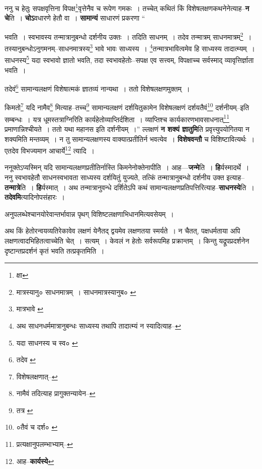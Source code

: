 \documentclass[article,12pt,a4paper]{memoir}
\begin{document}
	  \pstart ननु च हेतुः सपक्षवृत्तिना विपक्ष\footnote{क्षा}वृत्तेनैव च रूपेण गमकः । तच्चेत् कथितं किं विशेषलक्षणकथनेनेत्याह--\textbf{न चे}ति । \textbf{चोऽ}वधारणे हेतौ वा । \textbf{सामान्यं} साधारणं प्रकरणा  \leavevmode{} “
	  
	भवति । स्वभावस्य तन्मात्रानुबन्धो दर्शनीय उक्तः । तदिति साधनम् । तदेव तन्मात्रम् साधनमात्रम्\footnote{मात्रस्यानु० \cite{dp-msC} \cite{dp-msD} साधनमात्रम् । साधनमात्रस्यानुब० \cite{dp-msB} \cite{dp-edN}} । तस्यानुबन्धोऽनुगमनम्--साधनमात्रस्य\footnote{मात्रभावे \cite{dp-msA} \cite{dp-msB} \cite{dp-msD} \cite{dp-edP} \cite{dp-edH} \cite{dp-edE} \cite{dp-edN}} भावे भावः साध्यस्य । \footnote{अथ साधनधर्ममात्रानुबन्धः साध्यस्य तथापि तादात्म्यं न स्यादित्याह--\cite{dp-msD-n}}तन्मात्रभावित्वमेव हि साध्यस्य तादात्म्यम् । साधनस्य\footnote{यदा साधनस्य च स्व० \cite{dp-msC}} यदा स्वभावो ज्ञातो भवति, तदा स्वभावहेतोः--सपक्ष एव सत्त्वम्, विपक्षाच्च सर्वस्माद् व्यावृत्तिर्ज्ञाता भवति । 
	  
	तदेवं\footnote{तदेव \cite{dp-edE}} सामान्यलक्षणं विशेषात्मकं ज्ञातव्यं नान्यथा । ततो विशेषलक्षणमुक्तम् । 
	  
	किमतो\footnote{विशेषलक्षणात्--\cite{dp-msD-n}} यदि नामैव\footnote{नामैवं तदित्याह \cite{dp-edE} प्रागुक्तन्यायेन--\cite{dp-msD-n}} मित्याह--तच्च\footnote{तत्र \cite{dp-msA} \cite{dp-msB} \cite{dp-edP} \cite{dp-edH} \cite{dp-edE}} सामान्यलक्षणं दर्शयितुकामेन विशेषलक्षणं दर्शयतैवं\footnote{०तैवं च दर्श० \cite{dp-msB}} दर्शनीयम्--इति सम्बन्धः । यत्र धूमस्तत्राग्निरिति कार्यहेतोव्याप्तिर्दशिता । व्याप्तिश्च कार्यकारणभावसाधनात्\footnote{प्रत्यक्षानुपलम्भाभ्याम्--\cite{dp-msD-n}} प्रमाणान्निश्चीयते । ततो यथा महानस इति दर्शनीयम् ।” ल्लक्षणं \textbf{न शक्यं ज्ञातुमि}ति प्रवृत्त्युपयोगितया न शक्यमिति मन्तव्यम् । न तु सामान्यलक्षणस्य वाक्यात्प्रतीतिर्न भवत्येव । \textbf{विशेषवन्तौ} च विशिष्टावित्यर्थः । एतदेव विभज्यमान आचार्ये\footnote{आह--\textbf{कार्यस्ये}} त्यादि ।
	\pend
      

	  \pstart ननूक्तेऽप्यस्मिन् यदि सामान्यलक्षणप्रतीतिर्नास्ति किमनेनोक्तेनापीति । आह—\textbf{जन्मे}ति । \textbf{हि}र्यस्मादर्थे । ननु स्वभावहेतौ साधनस्वभावता साध्यस्य दर्शयितुं युज्यते, तत्किं तन्मात्रानुबन्धो दर्शनीय उक्त इत्याह--\textbf{तन्मात्रे}ति । \textbf{हि}र्यस्मात् । अथ तन्मात्रानुवन्धे दर्शितेऽपि कथं सामान्यलक्षणप्रतिपत्तिरित्याह--\textbf{साधनस्ये}ति । \textbf{तदेवमि}त्यादिनोपसंहारः ।
	\pend
      

	  \pstart अनुपलब्धेश्चानयोरेवान्तर्भावान्न पृथग् विशिष्टलक्षणाभिधानमित्यवसेयम् ।
	\pend
      

	  \pstart अथ किं हेतोरन्वयव्यतिरेकावेव लक्षणं येनैतद् द्वयमेव लक्षणतया स्मर्यते । न चैतत्, पक्षधर्मताया अपि लक्षणत्वादभिहितत्वाच्चेति चेत् । सत्यम् । केवलं न हेतोः सर्वरूपमिह प्रक्रान्तम् । किन्तु यद्रूपप्रदर्शनेन दृष्टान्तप्रदर्शनं कृतं भवति तत्प्रकृतमिति ।
	\pend
      
\end{document}

